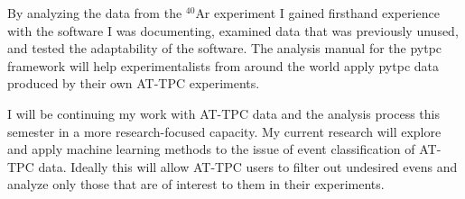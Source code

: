 \documentclass[a0paper,portrait]{baposter}
\begin{document}
\begin{poster}
{\small{ By analyzing the data from the $^{40}$Ar experiment I gained firsthand experience with the software I was documenting, examined data that was previously unused, and tested the adaptability of the software. The analysis manual for the pytpc framework will help experimentalists from around the world apply pytpc data produced by their own AT-TPC experiments.


I will be continuing my work with AT-TPC data and the analysis process this semester in a more research-focused capacity. My current research will explore and apply machine learning methods to the issue of event classification of AT-TPC data. Ideally this will allow AT-TPC users to filter out undesired evens and analyze only those that are of interest to them in their experiments. }
}
%
%
\end{poster}
\end{document}
